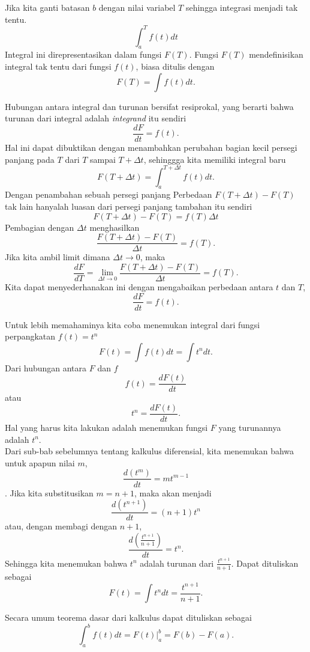 Jika kita ganti batasan $b$ dengan nilai variabel $T$ sehingga integrasi menjadi tak tentu. 
\[
\int^T_a f(t) dt
\]
Integral ini direpresentasikan dalam fungsi $F(T)$. Fungsi $F(T)$ mendefinisikan integral tak tentu dari fungsi $f(t)$, biasa ditulis dengan
\begin{equation}
F(T)=\int f(t) dt.
\end{equation}

Hubungan antara integral dan turunan bersifat resiprokal, yang berarti bahwa turunan dari integral adalah \textit{integrand} itu sendiri
\[
\frac{dF}{dt}=f(t).
\]
Hal ini dapat dibuktikan dengan menambahkan perubahan bagian kecil persegi panjang pada $T$ dari $T$ sampai $T+\Delta t$, sehinggga kita memiliki integral baru
\[
F(T+\Delta t)=\int^{T+\Delta t}_a f(t)dt.
\]  
Dengan penambahan sebuah persegi panjang Perbedaan $F(T+\Delta t)-F(T)$ tak lain hanyalah luasan dari persegi panjang tambahan itu sendiri
\[
F(T+\Delta t)-F(T)=f(T)\Delta t
\]
Pembagian dengan $\Delta t$ menghasilkan
\[
\frac{F(T+\Delta t)-F(T)}{\Delta t}=f(T).
\]
Jika kita ambil limit dimana $\Delta t \rightarrow 0$, maka
\[
\frac{dF}{dT}=\lim_{\Delta t \rightarrow 0} \frac{F(T+\Delta t)-F(T)}{\Delta t}=f(T).
\]  
Kita dapat menyederhanakan ini dengan mengabaikan perbedaan antara $t$ dan $T$,
\[
\frac{dF}{dt}=f(t).
\]

Untuk lebih memahaminya kita coba menemukan integral dari fungsi perpangkatan $f(t)=t^n$
\[
F(t)=\int f(t)dt=\int t^n dt.
\]
Dari hubungan antara $F$ dan $f$
\[
f(t)=\frac{dF(t)}{dt}
\]
atau
\[
t^n=\frac{dF(t)}{dt}.
\]
Hal yang harus kita lakukan adalah menemukan fungsi $F$ yang turunannya adalah $t^n$.\\
Dari sub-bab sebelumnya tentang kalkulus diferensial, kita menemukan bahwa untuk apapun nilai $m$,
\[
\frac{d(t^m)}{dt}=mt^{m-1}
\].
Jika kita substitusikan $m=n+1$, maka akan menjadi
\[
\frac{d(t^{n+1})}{dt}=(n+1)t^n
\]
atau, dengan membagi dengan $n+1$,
\[
\frac{d(\frac{t^{n+1}}{n+1})}{dt}=t^n.
\]
Sehingga kita menemukan bahwa $t^n$ adalah turunan dari $\frac{t^{n+1}}{n+1}$. Dapat dituliskan sebagai
\[
F(t)=\int t^n dt=\frac{t^{n+1}}{n+1}.
\]

Secara umum teorema dasar dari kalkulus dapat dituliskan sebagai
\begin{equation}
\int^b_af(t)dt=F(t)\vert^b_a=F(b)-F(a).
\end{equation}

